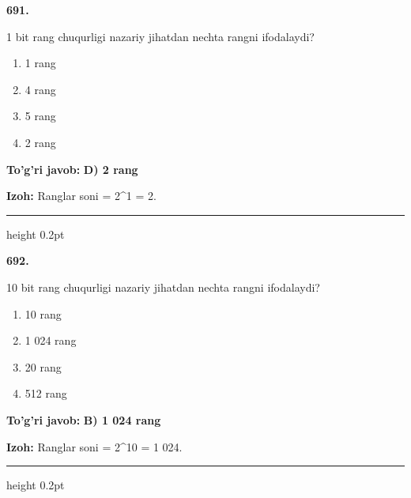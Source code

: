\documentclass[10pt,a4paper,oneside]{article}
\begin{document}
\noindent\textbf{\color{ink}691.}
\par
1 bit rang chuqurligi nazariy jihatdan nechta rangni ifodalaydi?
\begin{enumerate}[label=\Alph*),leftmargin=9mm]
\item 1 rang
\item 4 rang
\item 5 rang
\item 2 rang
\end{enumerate}
\begin{tcolorbox}[enhanced,breakable,colback=teal!4,colframe=teal!50!black,boxrule=0.5pt,arc=1.1mm,left=3mm,right=3mm,top=1.7mm,bottom=1.7mm,before skip=2mm,after skip=2mm]
\textbf{\color{teal}To'g'ri javob:} \textbf{D) 2 rang}
\par\smallskip
\textbf{Izoh:} Ranglar soni = 2\textasciicircum{}1 = 2.
\end{tcolorbox}
\vspace{2mm}\hrule height 0.2pt \vspace{3mm}

\noindent\textbf{\color{ink}692.}
\par
10 bit rang chuqurligi nazariy jihatdan nechta rangni ifodalaydi?
\begin{enumerate}[label=\Alph*),leftmargin=9mm]
\item 10 rang
\item 1 024 rang
\item 20 rang
\item 512 rang
\end{enumerate}
\begin{tcolorbox}[enhanced,breakable,colback=teal!4,colframe=teal!50!black,boxrule=0.5pt,arc=1.1mm,left=3mm,right=3mm,top=1.7mm,bottom=1.7mm,before skip=2mm,after skip=2mm]
\textbf{\color{teal}To'g'ri javob:} \textbf{B) 1 024 rang}
\par\smallskip
\textbf{Izoh:} Ranglar soni = 2\textasciicircum{}10 = 1 024.
\end{tcolorbox}
\vspace{2mm}\hrule height 0.2pt \vspace{3mm}
\end{document}
